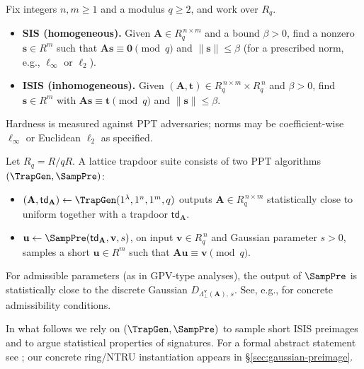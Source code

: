 \begin{definition}\label{def:sis-isis}
Fix integers $n,m\ge 1$ and a modulus $q\ge 2$, and work over $R_q$.
\begin{itemize}[leftmargin=1.25em]
  \item \textbf{SIS (homogeneous).} Given $\mathbf{A}\in R_q^{\,n\times m}$ and a bound $\beta>0$, find a nonzero $\mathbf{s}\in R^{m}$ such that $\mathbf{A}\mathbf{s}\equiv \mathbf{0}\pmod q$ and $\|\mathbf{s}\|\le\beta$ (for a prescribed norm, e.g., $\ell_\infty$ or $\ell_2$).
  \item \textbf{ISIS (inhomogeneous).} Given $(\mathbf{A},\mathbf{t})\in R_q^{\,n\times m}\times R_q^{\,n}$ and $\beta>0$, find $\mathbf{s}\in R^{m}$ with $\mathbf{A}\mathbf{s}\equiv \mathbf{t}\pmod q$ and $\|\mathbf{s}\|\le\beta$.
\end{itemize}
Hardness is measured against PPT adversaries; norms may be coefficient-wise $\ell_\infty$ or Euclidean $\ell_2$ as specified.
\end{definition}

\begin{definition}\label{def:trapdoor}
Let $R_q=R/qR$. A lattice trapdoor suite consists of two PPT algorithms $(\TrapGen,\SampPre)$:
\begin{itemize}[leftmargin=1.25em]
  \item $(\mathbf{A},\mathsf{td}_\mathbf{A})\leftarrow \TrapGen(1^\lambda,1^n,1^m,q)$ outputs $\mathbf{A}\in R_q^{\,n\times m}$ statistically close to uniform together with a trapdoor $\mathsf{td}_\mathbf{A}$.
  \item $\mathbf{u}\leftarrow \SampPre(\mathsf{td}_\mathbf{A},\mathbf{v},s)$, on input $\mathbf{v}\in R_q^{\,n}$ and Gaussian parameter $s>0$, samples a short $\mathbf{u}\in R^{m}$ such that $\mathbf{A}\mathbf{u}\equiv \mathbf{v}\pmod q$.
\end{itemize}
For admissible parameters (as in GPV-type analyses), the output of $\SampPre$ is statistically close to the discrete Gaussian $D_{\Lambda^{\mathbf{v}}_{\perp}(\mathbf{A}),\,s}$. See, e.g., \cite{GPV08} for concrete admissibility conditions.
\end{definition}

\begin{remark}[Trapdoors]\label{rem:trapdoors-bridge}
In what follows we rely on $(\TrapGen,\SampPre)$ to sample short ISIS preimages and to argue statistical properties of signatures.
For a formal abstract statement see ; our concrete ring/NTRU instantiation appears in \S\ref{sec:gaussian-preimage}.
\end{remark}

